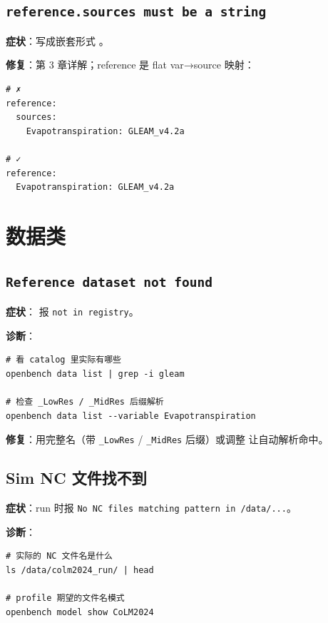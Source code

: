 \subsection{\texttt{reference.sources must be a string}}

\textbf{症状}：写成嵌套形式 。

\textbf{修复}：第 3 章详解；reference 是 flat var→source 映射：

\begin{verbatim}
# ✗
reference:
  sources:
    Evapotranspiration: GLEAM_v4.2a

# ✓
reference:
  Evapotranspiration: GLEAM_v4.2a
\end{verbatim}

\section{数据类}

\subsection{\texttt{Reference dataset not found}}

\textbf{症状}： 报 \texttt{not in registry}。

\textbf{诊断}：

\begin{verbatim}
# 看 catalog 里实际有哪些
openbench data list | grep -i gleam

# 检查 _LowRes / _MidRes 后缀解析
openbench data list --variable Evapotranspiration
\end{verbatim}

\textbf{修复}：用完整名（带 \texttt{\_LowRes} / \texttt{\_MidRes} 后缀）或调整  让自动解析命中。

\subsection{Sim NC 文件找不到}

\textbf{症状}：run 时报 \texttt{No NC files matching pattern in /data/...}。

\textbf{诊断}：

\begin{verbatim}
# 实际的 NC 文件名是什么
ls /data/colm2024_run/ | head

# profile 期望的文件名模式
openbench model show CoLM2024
\end{verbatim}

